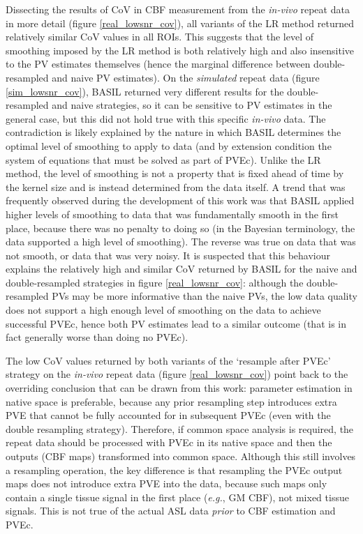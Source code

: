 Dissecting the results of CoV in CBF measurement from the \textit{in-vivo} repeat data in more detail (figure \ref{real_lowsnr_cov}), all variants of the LR method returned relatively similar CoV values in all ROIs. This suggests that the level of smoothing imposed by the LR method is both relatively high and also insensitive to the PV estimates themselves (hence the marginal difference between double-resampled and naive PV estimates). On the \textit{simulated} repeat data (figure \ref{sim_lowsnr_cov}), BASIL returned very different results for the double-resampled and naive strategies, so it can be sensitive to PV estimates in the general case, but this did not hold true with this specific \textit{in-vivo} data. The contradiction is likely explained by the nature in which BASIL determines the optimal level of smoothing to apply to data (and by extension condition the system of equations that must be solved as part of PVEc). Unlike the LR method, the level of smoothing is not a property that is fixed ahead of time by the kernel size and is instead determined from the data itself. A trend that was frequently observed during the development of this work was that BASIL applied higher levels of smoothing to data that was fundamentally smooth in the first place, because there was no penalty to doing so (in the Bayesian terminology, the data supported a high level of smoothing). The reverse was true on data that was not smooth, or data that was very noisy. It is suspected that this behaviour explains the relatively high and similar CoV returned by BASIL for the naive and double-resampled strategies in figure \ref{real_lowsnr_cov}: although the double-resampled PVs may be more informative than the naive PVs, the low data quality does not support a high enough level of smoothing on the data to achieve successful PVEc, hence both PV estimates lead to a similar outcome (that is in fact generally worse than doing no PVEc). 

The low CoV values returned by both variants of the `resample after PVEc' strategy on the \textit{in-vivo} repeat data (figure \ref{real_lowsnr_cov}) point back to the overriding conclusion that can be drawn from this work: parameter estimation in native space is preferable, because any prior resampling step introduces extra PVE that cannot be fully accounted for in subsequent PVEc (even with the double resampling strategy). Therefore, if common space analysis is required, the repeat data should be processed with PVEc in its native space and then the outputs (CBF maps) transformed into common space. Although this still involves a resampling operation, the key difference is that resampling the PVEc output maps does not introduce extra PVE into the data, because such maps only contain a single tissue signal in the first place (\textit{e.g.}, GM CBF), not mixed tissue signals. This is not true of the actual ASL data \textit{prior} to CBF estimation and PVEc. 

